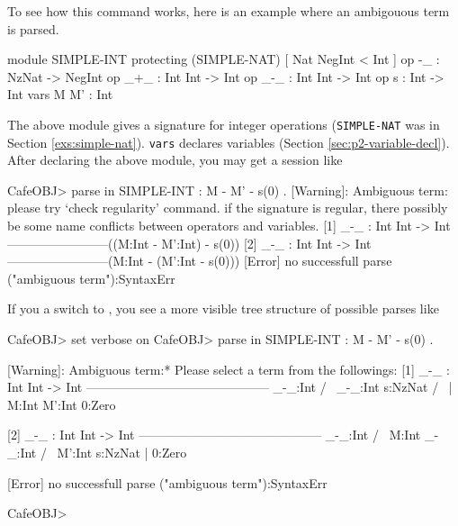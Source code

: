 \documentclass[a4paper]{memoir}
\begin{document}
To see how this command works, here is an example where an ambigouous term
is parsed.
\label{exs:simple-int}
\begin{vvtm}
\begin{ccode}
  module SIMPLE-INT {
    protecting (SIMPLE-NAT)
    [ Nat NegInt < Int ]
    op -_ : NzNat -> NegInt
    op _+_ : Int Int -> Int
    op _-_ : Int Int -> Int
    op s : Int -> Int
    vars M M' : Int
  }
\end{ccode}
\end{vvtm}
The above module gives a signature for integer operations
(\verb|SIMPLE-NAT| was in Section \ref{exs:simple-nat}).
\verb|vars| declares
variables (Section \ref{sec:p2-variable-decl}). After declaring
the above module, you may get a session like
\begin{vvtm}
\begin{ccode}
  CafeOBJ> parse in SIMPLE-INT : M - M' - s(0) .
  [Warning]: Ambiguous term:
      please try `check regularity' command.
      if the signature is regular, there possibly be 
      some name conflicts between operators and variables.
  [1] _-_ : Int Int -> Int ------------------------((M:Int - M':Int) - s(0))
  [2] _-_ : Int Int -> Int ------------------------(M:Int - (M':Int - s(0)))
  [Error] no successfull parse
    ("ambiguous term"):SyntaxErr
\end{ccode}
\end{vvtm}
If you  a switch  to , 
you see a more visible tree structure of possible parses like
\begin{vvtm}
\begin{ccode}
  CafeOBJ> set verbose on
  CafeOBJ> parse in SIMPLE-INT : M - M' - s(0) .

  [Warning]: Ambiguous term:* Please select a term from the followings:
  [1] _-_ : Int Int -> Int --------------------------------------------
            _-_:Int        
        /             \     
     _-_:Int       s:NzNat
    /       \         |     
  M:Int  M':Int    0:Zero  
                          
  [2] _-_ : Int Int -> Int --------------------------------------------
       _-_:Int             
    /            \          
  M:Int       _-_:Int      
            /         \     
         M':Int    s:NzNat
                      |     
                   0:Zero  

  [Error] no successfull parse
    ("ambiguous term"):SyntaxErr

  CafeOBJ> 
\end{ccode}
\end{vvtm}
\end{document}
